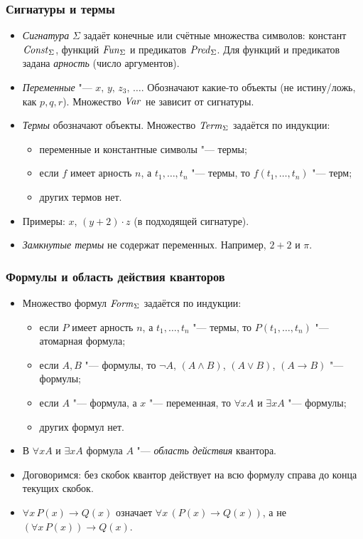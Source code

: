 \documentclass[10pt]{beamer}
\begin{document}
\begin{frame}
    \frametitle{Сигнатуры и термы}
    \begin{itemize}
        \item \emph{Сигнатура} $\Sigma$ задаёт конечные или счётные множества символов: констант $\mathit{Const}_\Sigma$, функций $\mathit{Fun}_\Sigma$ и предикатов $\mathit{Pred}_\Sigma$. Для функций и предикатов задана \emph{арность} (число аргументов).
        \item \emph{Переменные} "--- $x,\,y,\,z_3,\,\ldots$. Обозначают \pause какие-то объекты (не истину/ложь, как $p,q,r$). Множество $\mathit{Var}$ не зависит от сигнатуры. \pause
        \item \emph{Термы} обозначают объекты. Множество $\mathit{Term}_\Sigma$ задаётся по индукции:
        \begin{itemize}
            \item переменные и константные символы "--- термы;
            \item если $f$ имеет арность $n$, а $t_1,\ldots,t_n$ "--- термы, то $f(t_1,\ldots,t_n)$ "--- терм;
            \item других термов нет.
        \end{itemize}
        \pause
        \item Примеры: $x$, $(y+2)\cdot z$ (в подходящей сигнатуре).
        \item \emph{Замкнутые термы} не содержат переменных. Например, $2+2$ и $\pi$.
    \end{itemize}
\end{frame}

\begin{frame}
    \frametitle{Формулы и область действия кванторов}
    \begin{itemize}
        \item Множество формул $\mathit{Form}_\Sigma$ задаётся по индукции:
        \begin{itemize}
            \item если $P$ имеет арность $n$, а $t_1,\ldots,t_n$ "--- термы, то $P(t_1,\ldots,t_n)$ "--- атомарная формула;
            \item если $A,B$ "--- формулы, то $\neg A$, $(A\land B)$, $(A\lor B)$, $(A\to B)$ "--- формулы;
            \item если $A$ "--- формула, а $x$ "--- переменная, то $\forall x A$ и $\exists x A$ "--- формулы;
            \item других формул нет.
        \end{itemize}
        \pause
        \item В $\forall x A$ и $\exists x A$ формула $A$ "--- \emph{область действия} квантора.
        \item Договоримся: без скобок квантор действует на всю формулу справа до конца текущих скобок.
        \pause
        \item $\forall x\,P(x)\to Q(x)$ означает $\forall x\,(P(x)\to Q(x))$, а не $(\forall x\,P(x))\to Q(x)$.
    \end{itemize}
\end{frame}
\end{document}
